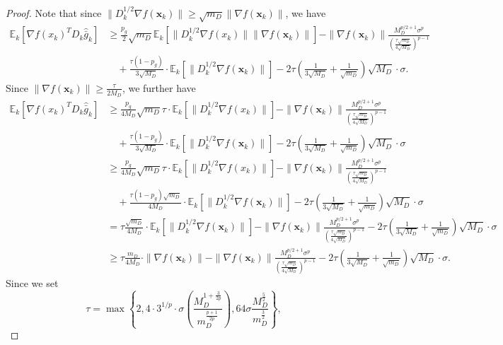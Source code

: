 \documentclass{article}
\newcommand{\bx}{\boldsymbol{x}}
\newcommand{\barg}{\bar{g}}
\theoremstyle{plain}
\theoremstyle{definition}
\theoremstyle{remark}
\begin{document}
\begin{proof}
Note that since $\|D_k^{1/2}\nabla f(\bx_k)\|\geq \sqrt{m_D}\|\nabla f(\bx_k)\|$, we have
\begin{align*}
    \mathbb{E}_k[\nabla f(x_k)^T D_k \widehat{\barg}_k ]
    & \geq \frac{p_g}{2}\sqrt{m_D}\mathbb{E}_k[\| D_k^{1/2} \nabla f(x_k)\|\|\nabla f(\bx_k)\|] -  \|\nabla f(\bx_k)\|\frac{M_D^{p/2+1} \sigma^p}{\left(\frac{\tau\sqrt{m_D}}{4\sqrt{M_D}}\right)^{p-1}} \\
    & \quad +  \frac{\tau (1-p_g)}{3\sqrt{M_D}} \cdot \mathbb{E}_k\left[\| D_k^{1/2}\nabla f(\bx_k)\|\right]  - 2\tau \left( \frac{1}{3\sqrt{M_D}} + \frac{1}{\sqrt{m_D}}\right) \sqrt{M_D} \cdot \sigma .
\end{align*}
Since $\|\nabla f(\bx_k)\|\geq \frac{\tau}{2M_D}$, we further have
\begin{align*}
    \mathbb{E}_k[\nabla f(x_k)^T D_k \widehat{\barg}_k ]
    & \geq \frac{p_g}{4M_D}\sqrt{m_D}\tau\cdot\mathbb{E}_k[\| D_k^{1/2} \nabla f(x_k)\|] -  \|\nabla f(\bx_k)\|\frac{M_D^{p/2+1} \sigma^p}{\left(\frac{\tau\sqrt{m_D}}{4\sqrt{M_D}}\right)^{p-1}} \\
    & \quad +  \frac{\tau (1-p_g)}{3\sqrt{M_D}} \cdot \mathbb{E}_k\left[\| D_k^{1/2}\nabla f(\bx_k)\|\right]  - 2\tau \left( \frac{1}{3\sqrt{M_D}} + \frac{1}{\sqrt{m_D}}\right) \sqrt{M_D} \cdot \sigma  \\
    & \geq \frac{p_g}{4M_D}\sqrt{m_D}\tau\cdot\mathbb{E}_k[\| D_k^{1/2} \nabla f(x_k)\|] -  \|\nabla f(\bx_k)\|\frac{M_D^{p/2+1} \sigma^p}{\left(\frac{\tau\sqrt{m_D}}{4\sqrt{M_D}}\right)^{p-1}} \\
    & \quad +  \frac{\tau (1-p_g)\sqrt{m_D}}{4M_D} \cdot \mathbb{E}_k\left[\| D_k^{1/2}\nabla f(\bx_k)\|\right]  - 2\tau \left( \frac{1}{3\sqrt{M_D}} + \frac{1}{\sqrt{m_D}}\right) \sqrt{M_D} \cdot \sigma  \\
    & = \tau  \frac{\sqrt{m_D}}{4M_D} \cdot \mathbb{E}_k\left[\| D_k^{1/2}\nabla f(\bx_k)\|\right] -  \|\nabla f(\bx_k)\|\frac{M_D^{p/2+1} \sigma^p}{\left(\frac{\tau\sqrt{m_D}}{4\sqrt{M_D}}\right)^{p-1}} - 2\tau \left( \frac{1}{3\sqrt{M_D}} + \frac{1}{\sqrt{m_D}}\right) \sqrt{M_D} \cdot \sigma \\
    & \geq \tau  \frac{m_D}{4M_D} \cdot \|\nabla f(\bx_k)\| -  \|\nabla f(\bx_k)\|\frac{M_D^{p/2+1} \sigma^p}{\left(\frac{\tau\sqrt{m_D}}{4\sqrt{M_D}}\right)^{p-1}} - 2\tau \left( \frac{1}{3\sqrt{M_D}} + \frac{1}{\sqrt{m_D}}\right) \sqrt{M_D} \cdot \sigma.
\end{align*}
Since we set 
\begin{equation*}
    \tau = \max\left\{2,  4\cdot 3^{1/p}\cdot \sigma\left(\frac{M_D^{1+\frac{3}{2p}}}{m_D^{\frac{p+1}{2p}}}\right), 64\sigma\frac{M_D^{\frac{5}{2}}}{m_D^{\frac{3}{2}}}\right\},

\end{equation*}
\end{proof}
\end{document}

